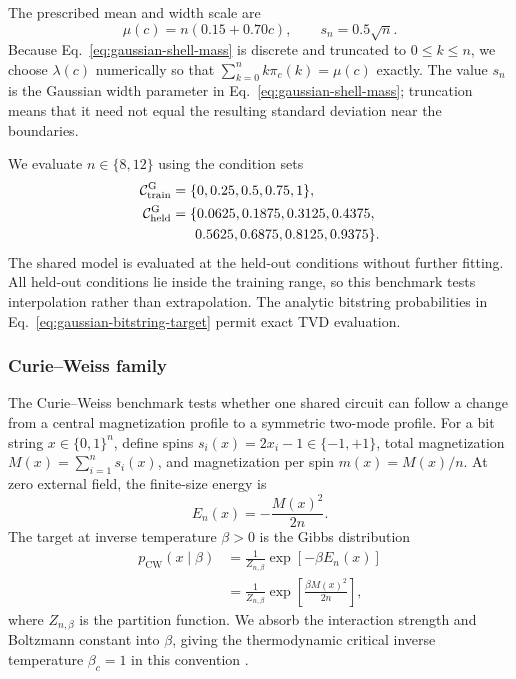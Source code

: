\documentclass[pra,aps,10pt,twocolumn,floatfix,superscriptaddress,
notitlepage,longbibliography]{revtex4-2}
\begin{document}
The prescribed mean and width scale are
\begin{equation}
    \mu(c)=n(0.15+0.70c),
    \qquad
    s_n=0.5\sqrt{n}.
    \label{eq:gaussian-target-parameters}
\end{equation}
Because Eq.~\eqref{eq:gaussian-shell-mass} is discrete and truncated to $0\leq k\leq n$, we choose $\lambda(c)$ numerically so that $\sum_{k=0}^n k\pi_c(k)=\mu(c)$ exactly. The value $s_n$ is the Gaussian width parameter in Eq.~\eqref{eq:gaussian-shell-mass}; truncation means that it need not equal the resulting standard deviation near the boundaries.

We evaluate $n\in\{8,12\}$ using the condition sets
\begin{align}
    \mathcal C_{\mathrm{train}}^{\mathrm G}
    &=\{0,0.25,0.5,0.75,1\},\\
    \mathcal C_{\mathrm{held}}^{\mathrm G}
    &=\{0.0625,0.1875,0.3125,0.4375,\nonumber\\
    &\hspace{1.7em}0.5625,0.6875,0.8125,0.9375\}.
    \label{eq:gaussian-condition-sets}
\end{align}
The shared model is evaluated at the held-out conditions without further fitting. All held-out conditions lie inside the training range, so this benchmark tests interpolation rather than extrapolation. The analytic bitstring probabilities in Eq.~\eqref{eq:gaussian-bitstring-target} permit exact TVD evaluation.

\subsubsection{Curie--Weiss family}

The Curie--Weiss benchmark tests whether one shared circuit can follow a change from a central magnetization profile to a symmetric two-mode profile. For a bit string $x\in\{0,1\}^n$, define spins $s_i(x)=2x_i-1\in\{-1,+1\}$, total magnetization $M(x)=\sum_{i=1}^n s_i(x)$, and magnetization per spin $m(x)=M(x)/n$. At zero external field, the finite-size energy is
\begin{equation}
    E_n(x)=-\frac{M(x)^2}{2n}.
    \label{eq:curie-weiss-energy}
\end{equation}
The target at inverse temperature $\beta>0$ is the Gibbs distribution
\begin{equation}
\begin{aligned}
    p_{\mathrm{CW}}(x\mid\beta)
    &=\frac{1}{Z_{n,\beta}}\exp[-\beta E_n(x)]\\
    &=\frac{1}{Z_{n,\beta}}\exp\!\left[\frac{\beta M(x)^2}{2n}\right],
\end{aligned}
    \label{eq:curie-weiss-bitstring-target}
\end{equation}
where $Z_{n,\beta}$ is the partition function. We absorb the interaction strength and Boltzmann constant into $\beta$, giving the thermodynamic critical inverse temperature $\beta_c=1$ in this convention \cite{ellisEntropyLargeDeviations2006}.
\end{document}
